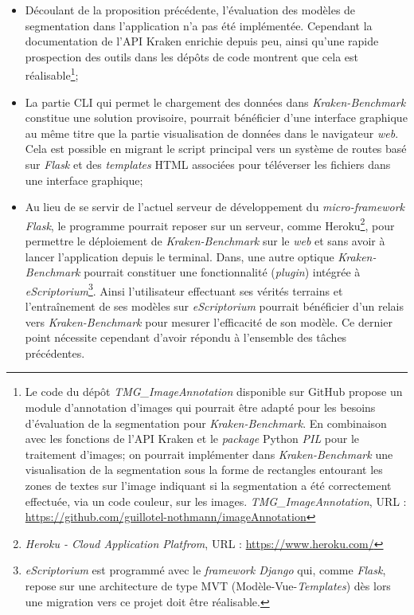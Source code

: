 \begin{itemize}
    \item Découlant de la proposition précédente, l'évaluation des modèles de segmentation dans l'application n'a pas été implémentée. Cependant la documentation de l'API Kraken enrichie depuis peu, ainsi qu'une rapide prospection des outils dans les dépôts de code montrent que cela est réalisable\footnote{Le code du dépôt \textit{TMG\_ImageAnnotation} disponible sur GitHub propose un module d'annotation d'images qui pourrait être adapté pour les besoins d'évaluation de la segmentation pour \textit{Kraken-Benchmark}. En combinaison avec les fonctions de l'API Kraken et le \textit{package} Python \textit{PIL} pour le traitement d'images; on pourrait implémenter dans \textit{Kraken-Benchmark} une visualisation de la segmentation sous la forme de rectangles entourant les zones de textes sur l'image indiquant si la segmentation a été correctement effectuée, via un code couleur, sur les images. \textit{TMG\_ImageAnnotation}, URL : \url{https://github.com/guillotel-nothmann/imageAnnotation}};
    \item La partie CLI qui permet le chargement des données dans \textit{Kraken-Benchmark} constitue une solution provisoire, pourrait bénéficier d'une interface graphique au même titre que la partie visualisation de données dans le navigateur \textit{web}. Cela est possible en migrant le script principal  vers un système de routes basé sur \textit{Flask} et des \textit{templates} HTML associées pour téléverser les fichiers dans une interface graphique;
    \item Au lieu de se servir de l'actuel serveur de développement du \textit{micro-framework Flask}, le programme pourrait reposer sur un serveur, comme Heroku\footnote{\textit{Heroku - Cloud Application Platfrom}, URL : \url{https://www.heroku.com/}}, pour permettre le déploiement de \textit{Kraken-Benchmark} sur le \textit{web} et sans avoir à lancer l'application depuis le terminal. Dans, une autre optique \textit{Kraken-Benchmark} pourrait constituer une fonctionnalité (\textit{plugin}) intégrée à \textit{eScriptorium}\footnote{\textit{eScriptorium} est programmé avec le \textit{framework Django} qui, comme \textit{Flask}, repose sur une architecture de type MVT (Modèle-Vue-\textit{Templates}) dès lors une migration vers ce projet doit être réalisable.}. Ainsi l'utilisateur effectuant ses vérités terrains et l'entraînement de ses modèles sur \textit{eScriptorium} pourrait bénéficier d'un relais vers \textit{Kraken-Benchmark} pour mesurer l'efficacité de son modèle. Ce dernier point nécessite cependant d'avoir répondu à l'ensemble des tâches précédentes.
\end{itemize}

